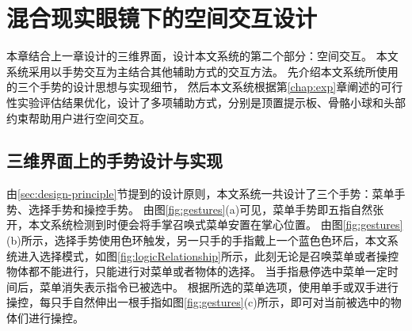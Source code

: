 
\chapter{混合现实眼镜下的空间交互设计}
\label{chap:interaction}

本章结合上一章设计的三维界面，设计本文系统的第二个部分：空间交互。
本文系统采用以手势交互为主结合其他辅助方式的交互方法。
先介绍本文系统所使用的三个手势的设计思想与实现细节，
然后本文系统根据第\ref{chap:exp}章阐述的可行性实验评估结果优化，设计了多项辅助方式，分别是顶置提示板、骨骼小球和头部约束帮助用户进行空间交互。



\section{三维界面上的手势设计与实现}

\begin{figure}[!htp]
	\centering
	\subfigure{\label{fig:gestures:menu}}\addtocounter{subfigure}{-2}
	\subfigure{\label{fig:gestureselect}}\addtocounter{subfigure}{-2}
		\subfigure{\label{fig:gesture:manipulate}}\addtocounter{subfigure}{-2}
	\vspace{-1em}
\end{figure}

由\ref{sec:design-principle}节提到的设计原则，本文系统一共设计了三个手势：菜单手势、选择手势和操控手势。
由图\ref{fig:gestures}(a)可见，菜单手势即五指自然张开，本文系统检测到时便会将手掌召唤式菜单安置在掌心位置。
由图\ref{fig:gestures}(b)所示，选择手势使用色环触发，另一只手的手指戴上一个蓝色色环后，本文系统进入选择模式，如图\ref{fig:logicRelationship}所示，此刻无论是召唤菜单或者操控物体都不能进行，只能进行对菜单或者物体的选择。
当手指悬停选中菜单一定时间后，菜单消失表示指令已被选中。
根据所选的菜单选项，使用单手或双手进行操控，每只手自然伸出一根手指如图\ref{fig:gestures}(c)所示，即可对当前被选中的物体们进行操控。

